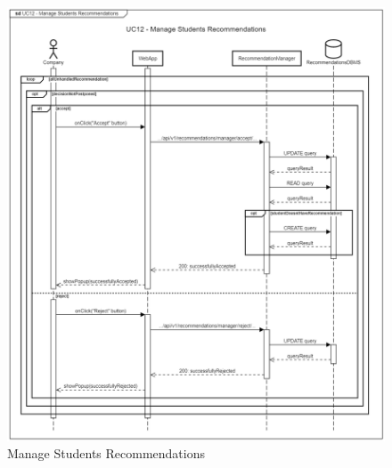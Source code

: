 \begin{figure}[H]
    \begin{center}
         \includegraphics[width=0.9\linewidth]{LaTeXCode/images/SequenceDiagrams/UC12-sequenceDiagram.png}
         \caption{Manage Students Recommendations}
         \label{fig:manage_students_recommendations_sd}
     \end{center}
\end{figure}

